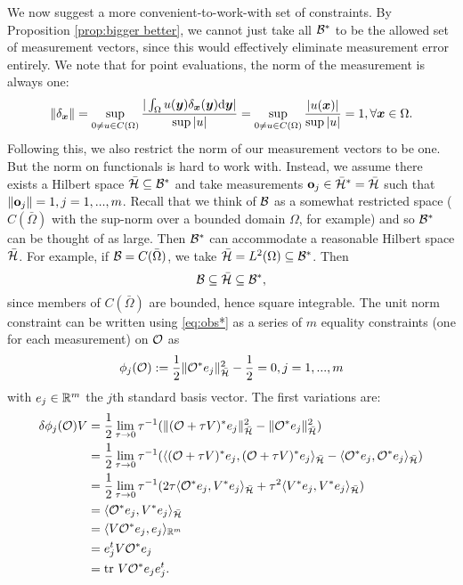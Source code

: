 \documentclass{amsart}
\numberwithin{equation}{section}
\begin{document}
We now suggest a more convenient-to-work-with set of constraints. By
Proposition \ref{prop:bigger better}, we cannot just take all $\mathcal{B}^*$
to be the allowed set of measurement vectors, since this would
effectively eliminate measurement error entirely. We note that for
point evaluations, the norm of the measurement is always one:
\begin{align*}
  \| \delta_{{\boldsymbol{x}}} \| = \sup_{0 \neq u \in C(\Omega)} \frac{
    |\int_{\Omega}u({\boldsymbol{y}}) \delta_{{\boldsymbol{x}}}({\boldsymbol{y}}) \text{\textup{d}} {\boldsymbol{y}}| 
  }{
    \sup|u|}
  = \sup_{0 \neq u \in C(\Omega)} \frac{|u({\boldsymbol{x}})|}{ \sup|u|} = 1,
  \forall {\boldsymbol{x}} \in \Omega.
\end{align*}
Following this, we also restrict the norm of our measurement vectors
to be one. But the norm on functionals is hard to work with. Instead,
we assume there exists a Hilbert space $\bar{\mathcal{H}} \subseteq \mathcal{B}^*$
and take measurements $\mathbf{o}_j \in \bar{\mathcal{H}}^* = \bar{\mathcal{H}}$ such
that $\| \mathbf{o}_j\| = 1, j=1,...,m$. Recall that we think of $\mathcal{B}$ as
a somewhat restricted space ($C(\bar{\Omega})$ with the sup-norm over
a bounded domain $\Omega$, for example) and so $\mathcal{B}^*$ can be thought
of as large. Then $\mathcal{B}^*$ can accommodate a reasonable Hilbert space
$\bar{\mathcal{H}}$. For example, if $\mathcal{B} = C(\bar{\Omega})$, we take
$\bar{\mathcal{H}} = L^2(\Omega) \subseteq \mathcal{B}^*$.
Then
%
\begin{equation*}
  \mathcal{B} \subseteq \bar{\mathcal{H}} \subseteq \mathcal{B}^*,
\end{equation*}
since members of $C(\bar{\Omega})$ are bounded, hence square integrable. The
unit norm constraint can be written using \eqref{eq:obs*} as a series of $m$ equality
constraints (one for each measurement) on $\mathcal{O}$ as
\begin{align}\label{eq:constraints}
  \phi_j(\mathcal{O}) :=\frac12 \| \mathcal{O}^* e_j\|_{\bar{\mathcal{H}}}^2 - \frac12 = 0,j=1,...,m
\end{align}
with $e_j \in \mathbb{R}^m$ the $j$th standard basis vector. The first variations are:
\begin{align*}
  \delta \phi_j(\mathcal{O})V  
  &= \frac12\lim_{\tau \to 0}\tau^{-1}
  ( \|(\mathcal{O} + \tau V)^*e_j \|_{\bar{\mathcal{H}}}^2 - \|\mathcal{O} ^*e_j \|_{\bar{\mathcal{H}}}^2  ) \\
  &= \frac12\lim_{\tau \to 0}\tau^{-1}
  ( \langle (\mathcal{O} + \tau V)^*e_j, (\mathcal{O} + \tau V)^*e_j \rangle_{\bar{\mathcal{H}}} - 
  \langle \mathcal{O}^*e_j, \mathcal{O}^*e_j \rangle_{\bar{\mathcal{H}}} ) \\
  &= \frac12\lim_{\tau \to 0}\tau^{-1}
  (2\tau \langle \mathcal{O}^*e_j,V^*e_j \rangle_{\bar{\mathcal{H}}} 
  +\tau^2 \langle V^*e_j, V^*e_j \rangle_{\bar{\mathcal{H}}} ) \\
  &= \langle \mathcal{O}^*e_j,V^*e_j \rangle_{\bar{\mathcal{H}}} \\
  &= \langle V \mathcal{O}^*e_j,e_j \rangle_{\mathbb{R}^m} \\
  &= e_j^t V \mathcal{O}^* e_j \\
  &= \textup{tr}\  V \mathcal{O}^* e_je_j^t.
\end{align*}
\end{document}
